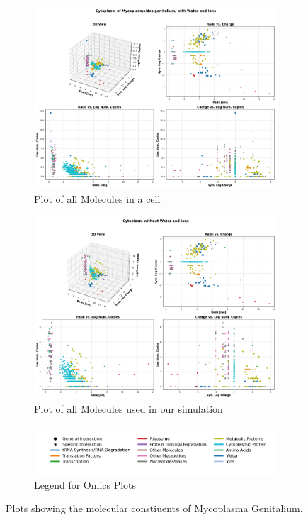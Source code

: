 \documentclass[draft, english]{volcanica-template}
\begin{document}
\begin{figure}[!htbp]
\centering
\begin{figure}[!htbp]
\centering
\includegraphics[width=0.7\linewidth]{files/WithIons_plot-d8d62f26c724fea39a95d3648bbf66ba.png}
\caption[]{Plot of all Molecules in a cell}
\label{Fig1_OmicsPlot}
\end{figure}

\begin{figure}[!htbp]
\centering
\includegraphics[width=0.7\linewidth]{files/NoIons_plot-3fae4ccd74344a549bbdf23799b84aac.png}
\caption[]{Plot of all Molecules used in our simulation}
\label{Fig1_OmicsPlot-b}
\end{figure}

\begin{figure}[!htbp]
\centering
\includegraphics[width=0.7\linewidth]{files/WithIons_legend-437386609052150ba82cfce77a8ae812.png}
\caption[]{Legend for Omics Plots}
\label{Fig1_OmicsPlot-c}
\end{figure}
\caption[]{Plots showing the molecular constiuents of Mycoplasma Genitalium.}
\label{Fig1_OmicsPlot-c}
\end{figure}
\end{document}
